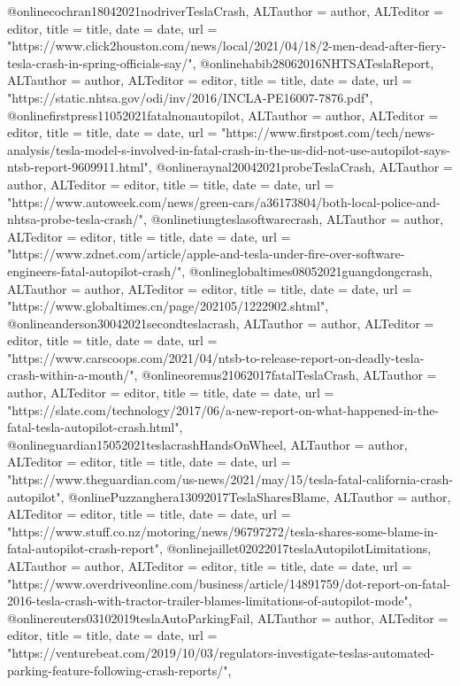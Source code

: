 {{{@online{cochran18042021nodriverTeslaCrash,	ALTauthor = {author},	ALTeditor = {editor},	title = {title},	date = {date},	url = {"https://www.click2houston.com/news/local/2021/04/18/2-men-dead-after-fiery-tesla-crash-in-spring-officials-say/"},}
@online{habib28062016NHTSATeslaReport,	ALTauthor = {author},	ALTeditor = {editor},	title = {title},	date = {date},	url = {"https://static.nhtsa.gov/odi/inv/2016/INCLA-PE16007-7876.pdf"},}
@online{firstpress11052021fatalnonautopilot,	ALTauthor = {author},	ALTeditor = {editor},	title = {title},	date = {date},	url = {"https://www.firstpost.com/tech/news-analysis/tesla-model-s-involved-in-fatal-crash-in-the-us-did-not-use-autopilot-says-ntsb-report-9609911.html"},}
@online{raynal20042021probeTeslaCrash,	ALTauthor = {author},	ALTeditor = {editor},	title = {title},	date = {date},	url = {"https://www.autoweek.com/news/green-cars/a36173804/both-local-police-and-nhtsa-probe-tesla-crash/"},}
@online{tiungteslasoftwarecrash,	ALTauthor = {author},	ALTeditor = {editor},	title = {title},	date = {date},	url = {"https://www.zdnet.com/article/apple-and-tesla-under-fire-over-software-engineers-fatal-autopilot-crash/"},}
@online{globaltimes08052021guangdongcrash,	ALTauthor = {author},	ALTeditor = {editor},	title = {title},	date = {date},	url = {"https://www.globaltimes.cn/page/202105/1222902.shtml"},}
@online{anderson30042021secondteslacrash,	ALTauthor = {author},	ALTeditor = {editor},	title = {title},	date = {date},	url = {"https://www.carscoops.com/2021/04/ntsb-to-release-report-on-deadly-tesla-crash-within-a-month/"},}
@online{oremus21062017fatalTeslaCrash,	ALTauthor = {author},	ALTeditor = {editor},	title = {title},	date = {date},	url = {"https://slate.com/technology/2017/06/a-new-report-on-what-happened-in-the-fatal-tesla-autopilot-crash.html"},}
@online{guardian15052021teslacrashHandsOnWheel,	ALTauthor = {author},	ALTeditor = {editor},	title = {title},	date = {date},	url = {"https://www.theguardian.com/us-news/2021/may/15/tesla-fatal-california-crash-autopilot"},}
@online{Puzzanghera13092017TeslaSharesBlame,	ALTauthor = {author},	ALTeditor = {editor},	title = {title},	date = {date},	url = {"https://www.stuff.co.nz/motoring/news/96797272/tesla-shares-some-blame-in-fatal-autopilot-crash-report"},}
@online{jaillet02022017teslaAutopilotLimitations,	ALTauthor = {author},	ALTeditor = {editor},	title = {title},	date = {date},	url = {"https://www.overdriveonline.com/business/article/14891759/dot-report-on-fatal-2016-tesla-crash-with-tractor-trailer-blames-limitations-of-autopilot-mode"},}
@online{reuters03102019teslaAutoParkingFail,	ALTauthor = {author},	ALTeditor = {editor},	title = {title},	date = {date},	url = {"https://venturebeat.com/2019/10/03/regulators-investigate-teslas-automated-parking-feature-following-crash-reports/"},}
}}}
